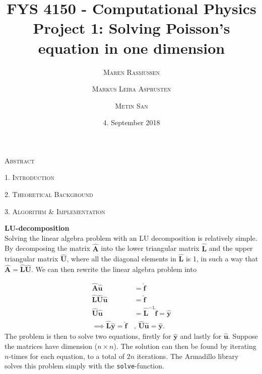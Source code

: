 \documentclass[a4paper,10pt]{article}
\title{FYS 4150 - Computational Physics\\
 Project 1: Solving Poisson's equation in one dimension 
}
\date{\normalsize{4. September 2018} }
\author{
 \textsc{\small{Maren Rasmussen}}\and \textsc{\small{Markus Leira Asprusten}}\and \textsc{\small{Metin San}}
 }
\begin{document}
\maketitle
\begin{center}
\textsc{Abstract}
\end{center}

\begin{adjustwidth}{7mm}{7mm}


\end{adjustwidth}



\bigskip

\begin{center}
\textsc{1. Introduction}
\end{center}



\begin{center}
\textsc{2. Theoretical Background}

\end{center}
\begin{center}
\textsc{3. Algorithm \& Implementation }
\end{center}
 \textbf{LU-decomposition} \\
Solving the linear algebra problem with an LU decomposition is relatively simple. By decomposing the matrix $\mathbf{\hat{A}}$ into the lower triangular matrix $\mathbf{\hat{L}}$ and the upper triangular matrix $\mathbf{\hat{U}}$, where all the diagonal elements in $\mathbf{\hat{L}}$ is 1, in such a way that $\mathbf{\hat{A}} = \mathbf{\hat{L}\hat{U}}$. We can then rewrite the linear algebra problem into

\begin{align}
	\mathbf{\hat{A}}\mathbf{\hat{u}} &= \mathbf{\hat{f}} \nonumber\\
	\mathbf{\hat{L}}\mathbf{\hat{U}}\mathbf{\hat{u}} &= \mathbf{\hat{f}} \nonumber\\
	\mathbf{\hat{U}}\mathbf{\hat{u}} &= \mathbf{\hat{L}}^{-1}\mathbf{\hat{f}} = \mathbf{\hat{y}} \nonumber\\
	\implies \mathbf{\hat{L}\hat{y}} = \mathbf{\hat{f}} \, &,\, \mathbf{\hat{U}\hat{u}} = \mathbf{\hat{y}}.
\end{align}
The problem is then to solve two equations, firstly for $\mathbf{\hat{y}}$ and lastly for $\mathbf{\hat{u}}$. Suppose the matrices have dimension ($n\times n$). The solution can then be found by iterating $n$-times for each equation, to a total of $2n$ iterations. The Armadillo library solves this problem simply with the \texttt{solve}-function.
\end{document}
